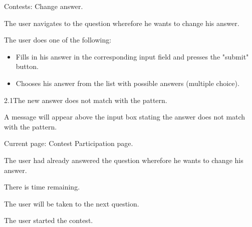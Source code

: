 \begin{uc}{Contests: Change answer.}

    \begin{uc-mss}
    \item The user navigates to the question wherefore he wants to change his answer. 
     \item The user does one of the following:
		\begin{itemize}
			\item Fills in his answer in the corresponding input field and presses the "submit" button.
			\item Chooses his answer from the list with possible answers (multiple choice).
		\end{itemize}
    \end{uc-mss}

    \begin{uc-ext}

        \begin{uc-fail}{2.1}{The new answer does not match with the pattern.}
        \item A message will appear above the input box stating the answer does not match with the pattern.
        \end{uc-fail}

    \end{uc-ext}

    \begin{uc-pre}
    \item Current page: Contest Participation page.
    \item The user had already answered the question wherefore he wants to change his answer.
    \item There is time remaining. 
    \end{uc-pre}

    \begin{uc-post}
    \item The user will be taken to the next question.
    \end{uc-post}

    \begin{uc-trig}
    The user started the contest. 
    \end{uc-trig}

\end{uc}

